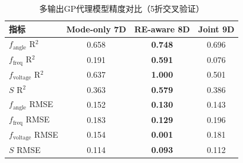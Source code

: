 \begin{table}[htbp]
\centering
\caption{多输出GP代理模型精度对比（5折交叉验证）}
\label{tab:gp_accuracy}
\begin{tabular}{lccc}
\toprule
指标 & Mode-only 7D & RE-aware 8D & Joint 9D \\
\midrule
$f_{\text{angle}}$ R$^2$ & 0.658 & \textbf{0.748} & 0.696 \\
$f_{\text{freq}}$ R$^2$ & 0.191 & \textbf{0.591} & 0.076 \\
$f_{\text{voltage}}$ R$^2$ & 0.637 & \textbf{1.000} & 0.501 \\
$S$ R$^2$ & 0.363 & \textbf{0.579} & 0.386 \\
\midrule
$f_{\text{angle}}$ RMSE & 0.152 & \textbf{0.130} & 0.143 \\
$f_{\text{freq}}$ RMSE & 0.183 & \textbf{0.129} & 0.196 \\
$f_{\text{voltage}}$ RMSE & 0.154 & \textbf{0.001} & 0.181 \\
$S$ RMSE & 0.114 & \textbf{0.093} & 0.112 \\
\bottomrule
\end{tabular}
\end{table}
